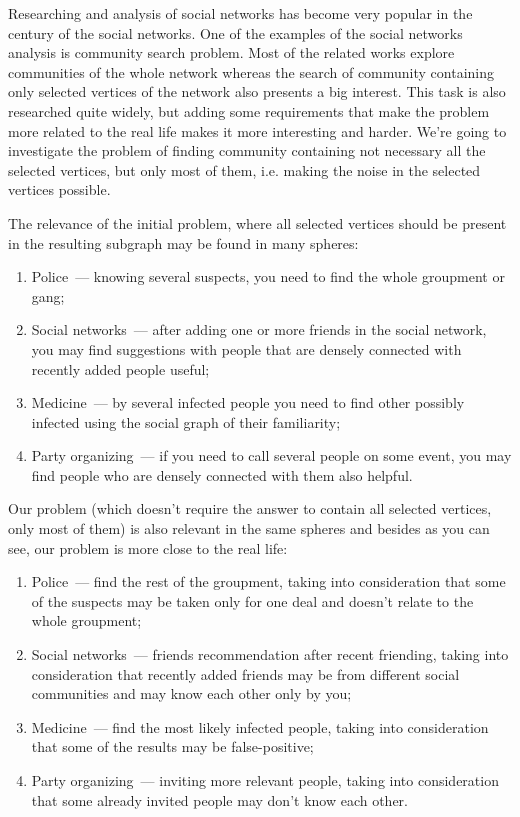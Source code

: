 \startprefacepage

Researching and analysis of social networks has become very popular in the century of the social networks. One of the examples of the social networks analysis is community search problem. Most of the related works explore communities of the whole network whereas the search of community containing only selected vertices of the network also presents a big interest. This task is also researched quite widely, but adding some requirements that make the problem more related to the real life makes it more interesting and harder. We're going to investigate the problem of finding community containing not necessary all the selected vertices, but only most of them, i.e. making the noise in the selected vertices possible.

The relevance of the initial problem, where all selected vertices should be present in the resulting subgraph may be found in many spheres:

\begin{enumerate}
  \item Police~--- knowing several suspects, you need to find the whole groupment or gang;
  \item Social networks~--- after adding one or more friends in the social network, you may find suggestions with people that are densely connected with recently added people useful;
  \item Medicine~--- by several infected people you need to find other possibly infected using the social graph of their familiarity;
  \item Party organizing~--- if you need to call several people on some event, you may find people who are densely connected with them also helpful.
\end{enumerate}

Our problem (which doesn't require the answer to contain all selected vertices, only most of them) is also relevant in the same spheres and besides as you can see, our problem is more close to the real life:

\begin{enumerate}
  \item Police~--- find the rest of the groupment, taking into consideration that some of the suspects may be taken only for one deal and doesn't relate to the whole groupment;
  \item Social networks~--- friends recommendation after recent friending, taking into consideration that recently added friends may be from different social communities and may know each other only by you;
  \item Medicine~--- find the most likely infected people, taking into consideration that some of the results may be false-positive;
  \item Party organizing~--- inviting more relevant people, taking into consideration that some already invited people may don't know each other.
\end{enumerate}

